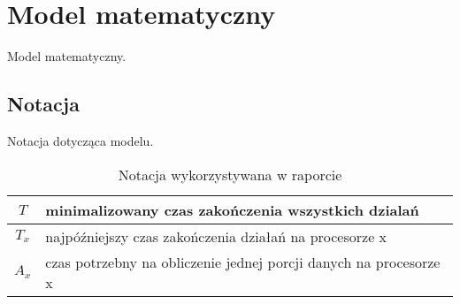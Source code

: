 
\section{Model matematyczny}

Model matematyczny.

\subsection{Notacja}

Notacja dotycząca modelu.

\begin{table}[!ht]
\centering
\begin{tabular}{|c|l|}
\hline
$T$ & minimalizowany czas zakończenia wszystkich dzialań \\ \hline
$T_{x}$ & najpóźniejszy czas zakończenia działań na procesorze x \\ \hline
$A_{x}$ & czas potrzebny na obliczenie jednej porcji danych na procesorze x \\ \hline
\end{tabular}
\caption{Notacja wykorzystywana w raporcie}
\label{tab:notacja}
\end{table}

